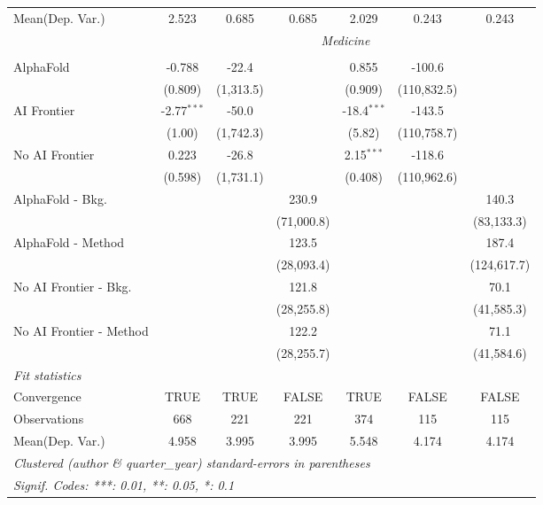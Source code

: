 \begin{tabular}{lcccccc}
Mean(Dep. Var.) & 2.523 & 0.685 & 0.685 & 2.029 & 0.243 & 0.243 \\
 & \multicolumn{6}{c}{\textit{Medicine}} \\ \\
   AlphaFold               & -0.788        & -22.4     &            & 0.855         & -100.6      &   \\   
                           & (0.809)       & (1,313.5) &            & (0.909)       & (110,832.5) &   \\   
   AI Frontier             & -2.77$^{***}$ & -50.0     &            & -18.4$^{***}$ & -143.5      &   \\   
                           & (1.00)        & (1,742.3) &            & (5.82)        & (110,758.7) &   \\   
   No AI Frontier          & 0.223         & -26.8     &            & 2.15$^{***}$  & -118.6      &   \\   
                           & (0.598)       & (1,731.1) &            & (0.408)       & (110,962.6) &   \\   
   AlphaFold - Bkg.        &               &           & 230.9      &               &             & 140.3\\   
                           &               &           & (71,000.8) &               &             & (83,133.3)\\   
   AlphaFold - Method      &               &           & 123.5      &               &             & 187.4\\   
                           &               &           & (28,093.4) &               &             & (124,617.7)\\   
   No AI Frontier - Bkg.   &               &           & 121.8      &               &             & 70.1\\   
                           &               &           & (28,255.8) &               &             & (41,585.3)\\   
   No AI Frontier - Method &               &           & 122.2      &               &             & 71.1\\   
                           &               &           & (28,255.7) &               &             & (41,584.6)\\   
   \midrule
   \emph{Fit statistics}\\
   Convergence             &TRUE           & TRUE      & FALSE      & TRUE          & FALSE       & FALSE\\  
   Observations            & 668           & 221       & 221        & 374           & 115         & 115\\  
Mean(Dep. Var.) & 4.958 & 3.995 & 3.995 & 5.548 & 4.174 & 4.174 \\
   \midrule \midrule
   \multicolumn{7}{l}{\emph{Clustered (author \& quarter\_year) standard-errors in parentheses}}\\
   \multicolumn{7}{l}{\emph{Signif. Codes: ***: 0.01, **: 0.05, *: 0.1}}\\
\end{tabular}
\par\endgroup
